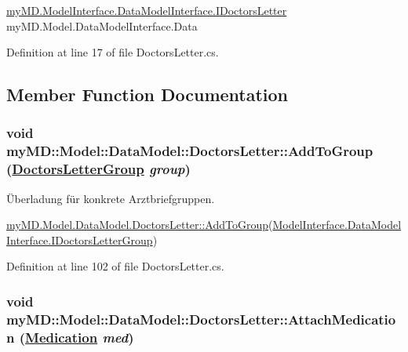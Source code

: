\hyperlink{interfacemy_m_d_1_1_model_interface_1_1_data_model_interface_1_1_i_doctors_letter}{my\-MD.Model\-Interface.Data\-Model\-Interface.IDoctors\-Letter} my\-MD.Model.Data\-Model\-Interface.Data 



Definition at line 17 of file Doctors\-Letter.cs.

\subsection{Member Function Documentation}
\hypertarget{classmy_m_d_1_1_model_1_1_data_model_1_1_doctors_letter_8eb99f11555636e6e2192231b87b59f0}{
\subsubsection[AddToGroup]{\setlength{\rightskip}{0pt plus 5cm}void my\-MD::Model::Data\-Model::Doctors\-Letter::Add\-To\-Group (\hyperlink{classmy_m_d_1_1_model_1_1_data_model_1_1_doctors_letter_group}{Doctors\-Letter\-Group} {\em group})}}
\label{dc/d86/classmy_m_d_1_1_model_1_1_data_model_1_1_doctors_letter_8eb99f11555636e6e2192231b87b59f0}


\"{U}berladung f\"{u}r konkrete Arztbriefgruppen. 

\hyperlink{classmy_m_d_1_1_model_1_1_data_model_1_1_doctors_letter_8eb99f11555636e6e2192231b87b59f0}{my\-MD.Model.Data\-Model.Doctors\-Letter::Add\-To\-Group}(\hyperlink{interfacemy_m_d_1_1_model_interface_1_1_data_model_interface_1_1_i_doctors_letter_group}{Model\-Interface.Data\-Model\-Interface.IDoctors\-Letter\-Group}) 

Definition at line 102 of file Doctors\-Letter.cs.\hypertarget{classmy_m_d_1_1_model_1_1_data_model_1_1_doctors_letter_c6c9d35845c1c0e4c389656215df6e2e}{
\subsubsection[AttachMedication]{\setlength{\rightskip}{0pt plus 5cm}void my\-MD::Model::Data\-Model::Doctors\-Letter::Attach\-Medication (\hyperlink{classmy_m_d_1_1_model_1_1_data_model_1_1_medication}{Medication} {\em med})}}
\label{dc/d86/classmy_m_d_1_1_model_1_1_data_model_1_1_doctors_letter_c6c9d35845c1c0e4c389656215df6e2e}


